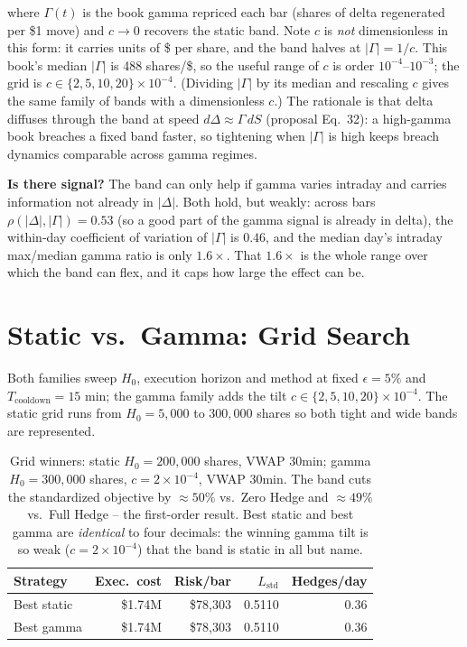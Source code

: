 \documentclass[11pt]{article}
\begin{document}
where $\Gamma(t)$ is the book gamma repriced each bar (shares of delta regenerated per
\$1 move) and $c \to 0$ recovers the static band. Note $c$ is \emph{not} dimensionless in
this form: it carries units of \$ per share, and the band halves at
$\lvert\Gamma\rvert = 1/c$. This book's median $\lvert\Gamma\rvert$ is 488 shares/\$, so
the useful range of $c$ is order $10^{-4}$--$10^{-3}$; the grid is
$c \in \{2,5,10,20\}\times10^{-4}$. (Dividing $\lvert\Gamma\rvert$ by its median and
rescaling $c$ gives the same family of bands with a dimensionless $c$.)
The rationale is that delta diffuses through the band at speed
$d\Delta \approx \Gamma\,dS$ (proposal Eq.~32): a high-gamma book breaches a fixed band
faster, so tightening when $\lvert\Gamma\rvert$ is high keeps breach dynamics comparable
across gamma regimes.

\textbf{Is there signal?} The band can only help if gamma varies intraday and carries
information not already in $\lvert\Delta\rvert$. Both hold, but weakly: across bars
$\rho(\lvert\Delta\rvert,\lvert\Gamma\rvert) = 0.53$ (so a good part of the gamma signal
is already in delta), the within-day coefficient of variation of $\lvert\Gamma\rvert$ is
$0.46$, and the median day's intraday max/median gamma ratio is only $1.6\times$. That
$1.6\times$ is the whole range over which the band can flex, and it caps how large the
effect can be.

\section{Static vs.\ Gamma: Grid Search}

Both families sweep $H_0$, execution horizon and method at fixed $\epsilon = 5\%$ and
$T_{\text{cooldown}} = 15$ min; the gamma family adds the tilt $c \in \{2,5,10,20\}\times10^{-4}$. The
static grid runs from $H_0 = 5{,}000$ to $300{,}000$ shares so both tight and wide bands
are represented.

\begin{table}[htbp]
\centering
\small
\begin{tabular}{lrrrr}
\toprule
\textbf{Strategy} & \textbf{Exec.\ cost} & \textbf{Risk/bar} & $L_{\text{std}}$ & \textbf{Hedges/day} \\
\midrule
Best static & \$1.74M & \$78{,}303 & 0.5110 & 0.36 \\
Best gamma  & \$1.74M & \$78{,}303 & 0.5110 & 0.36 \\
\bottomrule
\end{tabular}
\caption{Grid winners: static $H_0 = 200{,}000$ shares, VWAP 30min; gamma
$H_0 = 300{,}000$ shares, $c = 2\times10^{-4}$, VWAP 30min. The band cuts the standardized
objective by $\approx50\%$ vs.\ Zero Hedge and $\approx49\%$ vs.\ Full Hedge -- the
first-order result. Best static and best gamma are \emph{identical} to four decimals: the
winning gamma tilt is so weak ($c = 2\times10^{-4}$) that the band is static in all but name.}
\end{table}
\end{document}

